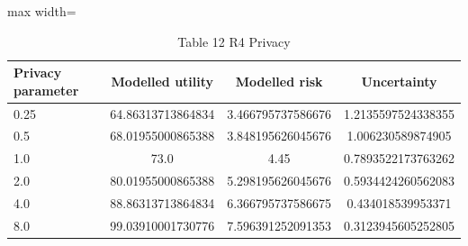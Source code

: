 \begin{table}[tbp]
\centering
\footnotesize
\caption{Table 12 R4 Privacy}
\label{tab:table_12_r4_privacy}
\begin{adjustbox}{max width=\linewidth}
\begin{tabular}{lccc}
\toprule
Privacy parameter & Modelled utility & Modelled risk & Uncertainty \\
\midrule
0.25 & 64.86313713864834 & 3.466795737586676 & 1.2135597524338355 \\
0.5 & 68.01955000865388 & 3.848195626045676 & 1.006230589874905 \\
1.0 & 73.0 & 4.45 & 0.7893522173763262 \\
2.0 & 80.01955000865388 & 5.298195626045676 & 0.5934424260562083 \\
4.0 & 88.86313713864834 & 6.366795737586675 & 0.434018539953371 \\
8.0 & 99.03910001730776 & 7.596391252091353 & 0.3123945605252805 \\
\bottomrule
\end{tabular}
\end{adjustbox}
\end{table}
